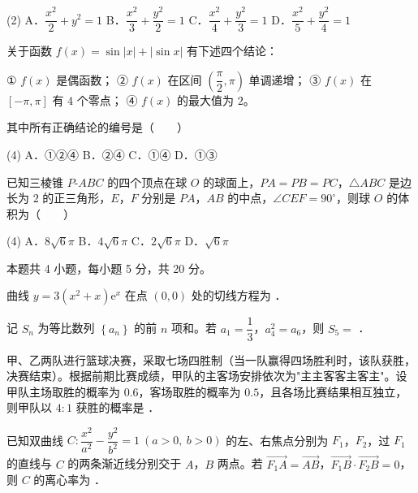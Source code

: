 \begin{gkopts}(2)
\task A．$\dfrac{x^{2}}2+y^{2}=1$
\task B．$\dfrac{x^{2}}3+\dfrac{y^{2}}2=1$
\task C．$\dfrac{x^{2}}4+\dfrac{y^{2}}3=1$
\task D．$\dfrac{x^{2}}5+\dfrac{y^{2}}4=1$
\end{gkopts}

关于函数 $f(x)=\sin|x|+|\sin x|$ 有下述四个结论：

  ① $f(x)$ 是偶函数；
  ② $f(x)$ 在区间 $\left(\dfrac\pi2,\pi\right)$ 单调递增；
  ③ $f(x)$ 在 $[-\pi,\pi]$ 有 $4$ 个零点；
  ④ $f(x)$ 的最大值为 $2$。

其中所有正确结论的编号是（　　）

\begin{gkopts}(4)
\task A．①②④
\task B．②④
\task C．①④
\task D．①③
\end{gkopts}

已知三棱锥 $P\text{-}ABC$ 的四个顶点在球 $O$ 的球面上，$PA=PB=PC$，$\triangle ABC$ 是边长为 $2$ 的正三角形，$E$，$F$ 分别是 $PA$，$AB$ 的中点，$\angle CEF=90^\circ$，则球 $O$ 的体积为（　　）

\begin{gkopts}(4)
\task A．$8\sqrt6\pi$
\task B．$4\sqrt6\pi$
\task C．$2\sqrt6\pi$
\task D．$\sqrt6\pi$
\end{gkopts}

\par\medskip


\begin{gktip}
本题共 4 小题，每小题 5 分，共 20 分。
\end{gktip}

曲线 $y=3\left(x^{2}+x\right)\mathrm e^{x}$ 在点 $(0,0)$ 处的切线方程为 \gkblank{}．

记 $S_n$ 为等比数列 $\left\{a_n\right\}$ 的前 $n$ 项和。若 $a_1=\dfrac13$，$a_4^{2}=a_6$，则 $S_5=$ \gkblank{}．

甲、乙两队进行篮球决赛，采取七场四胜制（当一队赢得四场胜利时，该队获胜，决赛结束）。根据前期比赛成绩，甲队的主客场安排依次为"主主客客主客主"。设甲队主场取胜的概率为 $0.6$，客场取胜的概率为 $0.5$，且各场比赛结果相互独立，则甲队以 $4:1$ 获胜的概率是 \gkblank{}．

已知双曲线 $C:\dfrac{x^{2}}{a^{2}}-\dfrac{y^{2}}{b^{2}}=1\ (a>0,\ b>0)$ 的左、右焦点分别为 $F_1$，$F_2$，过 $F_1$ 的直线与 $C$ 的两条渐近线分别交于 $A$，$B$ 两点。若 $\overrightarrow{F_1A}=\overrightarrow{AB}$，$\overrightarrow{F_1B}\cdot\overrightarrow{F_2B}=0$，则 $C$ 的离心率为 \gkblank{}．

